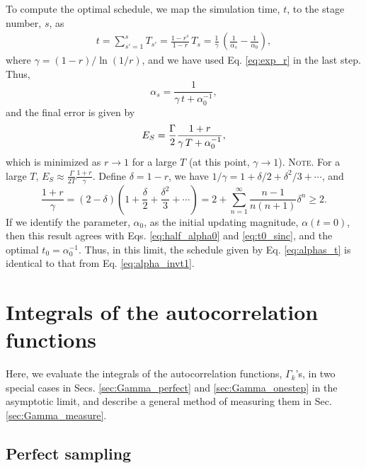 \documentclass[reprint, superscriptaddress, floatfix]{revtex4-1}
\newcommand{\note}[1]{{\color{DarkGreen}\footnotesize \textsc{Note.} #1}}
\begin{document}
To compute the optimal schedule,
we map the simulation time, $t$, to the stage number, $s$, as
%
\begin{align*}
  t
  = \sum_{s' = 1}^s T_{s'}
  = \frac{ 1 - r^s } { 1 - r } \, T_s
  = \frac{ 1 } { \gamma } \,
  \left(
    \frac{1}{\alpha_s}
    -
    \frac{1}{\alpha_0}
  \right)
  ,
\end{align*}
where
$\gamma = ( 1 - r ) / \ln(1/r)$,
and we have used Eq. \eqref{eq:exp_r} in the last step.
%
Thus,
%
\begin{equation}
  \alpha_s =
  \frac{ 1 }
  { \gamma \, t + \alpha_0^{-1} }
  ,
  \label{eq:alphas_t}
\end{equation}
%
and the final error is given by
%
\begin{align}
  E_S
  =
  \frac{\Gamma}{2}
  \frac{ 1 + r }
  { \gamma \, T + \alpha_0^{-1} }
  ,
  \notag
\end{align}
%
which is minimized as $r \to 1$
for a large $T$
(at this point, $\gamma \to 1$).
%
\note{
  For a large $T$, $E_S \approx \frac{\Gamma}{2T} \frac{1+r}{\gamma}$.
  Define $\delta = 1 - r$,
  we have $1/\gamma = 1+ \delta/2 + \delta^2/3 + \cdots$,
  and
  $$
  \frac{1+r}{\gamma}
  =
  (2 - \delta)
  \left(
  1 + \frac{\delta}{2} + \frac{\delta^2}{3} + \cdots
  \right)
  =
  2 + \sum_{n=1}^\infty \frac{n-1}{n(n+1)}\delta^n \ge 2
  .
  $$
}
%
If we identify the parameter, $\alpha_0$,
as the initial updating magnitude, $\alpha(t = 0)$,
then this result agrees with Eqs. \eqref{eq:half_alpha0} and \eqref{eq:t0_sinc},
and the optimal $t_0 = \alpha_0^{-1}$.
%
Thus, in this limit,
the schedule given by Eq. \eqref{eq:alphas_t}
is identical to that from Eq. \eqref{eq:alpha_invt1}.





\section{\label{sec:Gamma}
Integrals of the autocorrelation functions}



Here, we evaluate the integrals of
the autocorrelation functions,
$\Gamma_k$'s,
in two special cases
in Secs. \ref{sec:Gamma_perfect}
and \ref{sec:Gamma_onestep}
in the asymptotic limit,
and describe a general method of measuring them
in Sec. \ref{sec:Gamma_measure}.



\subsection{\label{sec:Gamma_perfect}
Perfect sampling}
\end{document}
